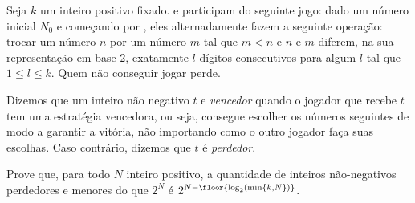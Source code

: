 Seja $k$ um inteiro positivo fixado.  e  participam do seguinte jogo:
dado um número inicial $N_0$ e começando por , eles alternadamente fazem a seguinte operação:
trocar um número $n$ por um número $m$ tal que $m < n$ e $n$ e $m$ diferem, na sua representação em base 2, exatamente $l$ dígitos consecutivos para algum $l$ tal que $1 \le l \le k$. Quem não conseguir jogar perde.

Dizemos que um inteiro não negativo $t$ e \textit{vencedor} quando o jogador que recebe $t$ tem uma estratégia vencedora, ou seja, consegue escolher os números seguintes de modo a garantir a vitória, não importando como o outro jogador faça suas escolhas. Caso contrário, dizemos que $t$ é \textit{perdedor}.

Prove que, para todo $N$ inteiro positivo, a quantidade de inteiros não-negativos perdedores e menores do que $2^N$ é $2^{N-\floor{\log_2(\mathrm{min}\{k, N\})}}$.

